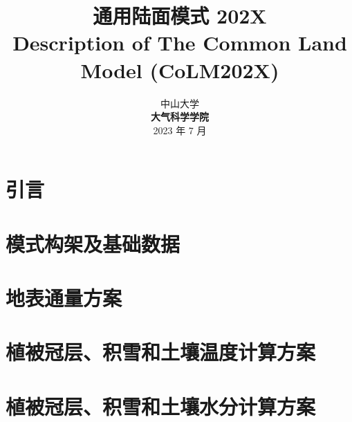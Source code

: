 \documentclass[a4paper,12pt,twoside]{report}
\begin{document}
%

\title{\huge {\bf 通用陆面模式 202X}\\[3em]
\fontsize {22}{24}
\bf{ Description of The Common Land Model (CoLM202X)}\\[3in]
\fontsize {20}{23}%
}

\author{
 \large{ 中山大学 }\\[0.1in]
 {\bf 大气科学学院}\\[1in]
 \upshape
 \large%
2023 年 7 月
}

\normallinespacing
\maketitle

\preface

%
%
%
%

\body
\part{引言}

\part{模式构架及基础数据}



\part{地表通量方案}






\part{植被冠层、积雪和土壤温度计算方案}



\part{植被冠层、积雪和土壤水分计算方案}

\end{document}
